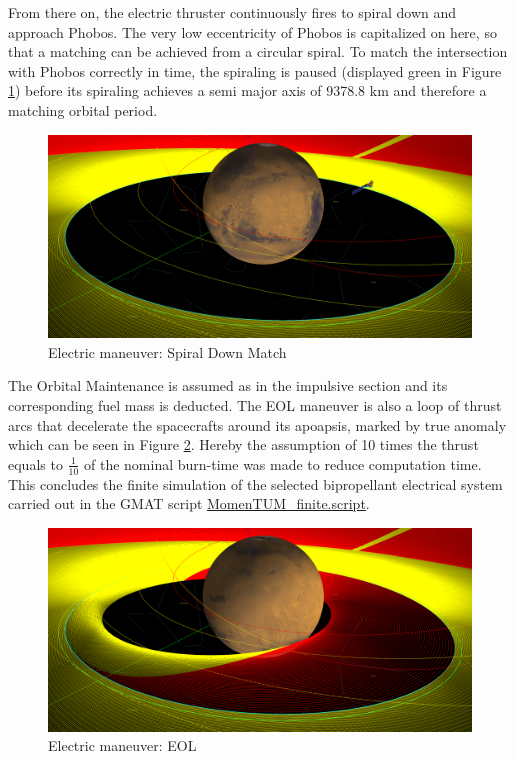 \documentclass[conference]{IEEEtran}
\begin{document}
From there on, the electric thruster continuously fires to spiral down and approach Phobos. The very low eccentricity of Phobos is capitalized on here, so that a matching can be achieved from a circular spiral. To match the intersection with Phobos correctly in time, the spiraling is paused (displayed green in Figure \ref{fig:spiral}) before its spiraling achieves a semi major axis of 9378.8 km and therefore a matching orbital period.

\begin{figure}[H]
  \centering
  \includegraphics[width=\linewidth]{img/el_sprial.png}
  \caption{Electric maneuver: Spiral Down Match}
  \label{fig:spiral}
\end{figure}

The Orbital Maintenance is assumed as in the impulsive section and its corresponding fuel mass is deducted. The EOL maneuver is also a loop of thrust arcs that decelerate the spacecrafts around its apoapsis, marked by true anomaly which can be seen in Figure \ref{fig:eol}. Hereby the assumption of 10 times the thrust equals to $\frac{1}{10}$ of the nominal burn-time was made to reduce computation time. This concludes the finite simulation of the selected bipropellant electrical system carried out in the GMAT script \href{https://github.com/Sven-J-Steinert/MomenTUM/blob/main/GMAT/MomenTUM_finite.script}{\colorbox{codegray}{MomenTUM\_finite.script}}.

\begin{figure}[H]
  \centering
  \includegraphics[width=\linewidth]{img/el_eol.png}
  \caption{Electric maneuver: EOL}
  \label{fig:eol}
\end{figure}
\end{document}
